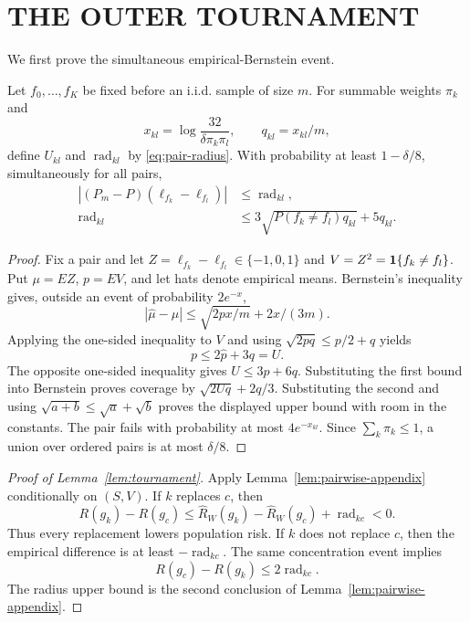 \section{THE OUTER TOURNAMENT}
\label{app:tournament}

We first prove the simultaneous empirical-Bernstein event.

\begin{lemma}
\label{lem:pairwise-appendix}
Let $f_0,\ldots,f_K$ be fixed before an i.i.d. sample of size $m$. For summable weights $\pi_k$ and
\[
 x_{kl}=\log\frac{32}{\delta\pi_k\pi_l},\qquad
 q_{kl}=x_{kl}/m,
\]
define $U_{kl}$ and $\operatorname{rad}_{kl}$ by \eqref{eq:pair-radius}. With probability at least $1-\delta/8$, simultaneously for all pairs,
\begin{align*}
 |(P_m-P)(\ell_{f_k}-\ell_{f_l})|
 &\leq\operatorname{rad}_{kl},\\
 \operatorname{rad}_{kl}
 &\leq3\sqrt{P(f_k\ne f_l)q_{kl}}+5q_{kl}.
\end{align*}
\end{lemma}

\begin{proof}
Fix a pair and let $Z=\ell_{f_k}-\ell_{f_l}\in\{-1,0,1\}$ and $V=Z^2=\mathbf 1\{f_k\ne f_l\}$. Put $\mu=EZ$, $p=EV$, and let hats denote empirical means. Bernstein's inequality gives, outside an event of probability $2e^{-x}$,
\[
 |\widehat\mu-\mu|
 \leq\sqrt{2px/m}+2x/(3m).
\]
Applying the one-sided inequality to $V$ and using $\sqrt{2pq}\leq p/2+q$ yields
\[
 p\leq2\widehat p+3q=U.
\]
The opposite one-sided inequality gives $U\leq3p+6q$. Substituting the first bound into Bernstein proves coverage by $\sqrt{2Uq}+2q/3$. Substituting the second and using $\sqrt{a+b}\leq\sqrt a+\sqrt b$ proves the displayed upper bound with room in the constants. The pair fails with probability at most $4e^{-x_{kl}}$. Since $\sum_k\pi_k\leq1$, a union over ordered pairs is at most $\delta/8$.
\end{proof}

\begin{proof}[Proof of Lemma~\ref{lem:tournament}]
Apply Lemma~\ref{lem:pairwise-appendix} conditionally on $(S,V)$. If $k$ replaces $c$, then
\[
 R(g_k)-R(g_c)
 \leq\widehat R_W(g_k)-\widehat R_W(g_c)
 +\operatorname{rad}_{kc}<0.
\]
Thus every replacement lowers population risk. If $k$ does not replace $c$, then the empirical difference is at least $-\operatorname{rad}_{kc}$. The same concentration event implies
\[
 R(g_c)-R(g_k)\leq2\operatorname{rad}_{kc}.
\]
The radius upper bound is the second conclusion of Lemma~\ref{lem:pairwise-appendix}.
\end{proof}

